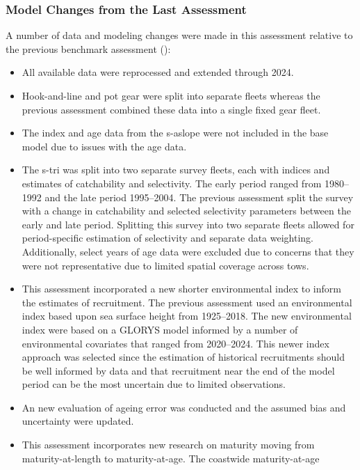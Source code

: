 \documentclass[
  english,
]{article}
\providecommand{\tightlist}{%
  \setlength{\itemsep}{0pt}\setlength{\parskip}{0pt}}
\begin{document}
\subsubsection{Model Changes from the Last Assessment}\label{changes}

A number of data and modeling changes were made in this assessment
relative to the previous benchmark assessment
():

\begin{itemize}
\tightlist
\item
  All available data were reprocessed and extended through 2024.
\item
  Hook-and-line and pot gear were split into separate fleets whereas the
  previous assessment combined these data into a single fixed gear
  fleet.
\item
  The index and age data from the \gls{s-aslope} were not included in
  the base model due to issues with the age data.
\item
  The \gls{s-tri} was split into two separate survey fleets, each with
  indices and estimates of catchability and selectivity. The early
  period ranged from 1980--1992 and the late period 1995--2004. The
  previous assessment split the survey with a change in catchability and
  selected selectivity parameters between the early and late period.
  Splitting this survey into two separate fleets allowed for
  period-specific estimation of selectivity and separate data weighting.
  Additionally, select years of age data were excluded due to concerns
  that they were not representative due to limited spatial coverage
  across tows.
\item
  This assessment incorporated a new shorter environmental index to
  inform the estimates of recruitment. The previous assessment used an
  environmental index based upon sea surface height from 1925--2018. The
  new environmental index were based on a GLORYS model informed by a
  number of environmental covariates that ranged from 2020--2024. This
  newer index approach was selected since the estimation of historical
  recruitments should be well informed by data and that recruitment near
  the end of the model period can be the most uncertain due to limited
  observations.
\item
  An new evaluation of ageing error was conducted and the assumed bias
  and uncertainty were updated.
\item
  This assessment incorporates new research on maturity moving from
  maturity-at-length to maturity-at-age. The coastwide maturity-at-age

\end{itemize}
\end{document}

